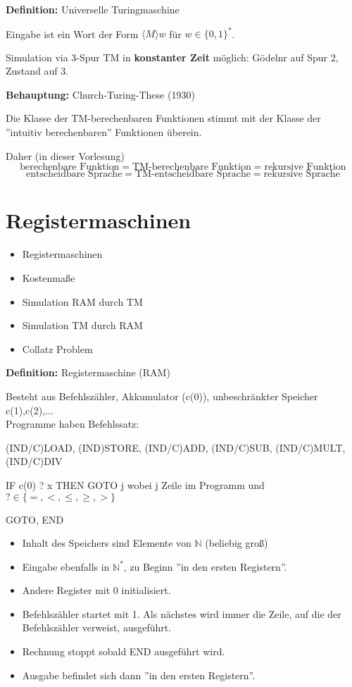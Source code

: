 \documentclass[a4paper,graphics,11pt]{article}
\begin{document}
\strut

\textbf{Definition:} Universelle Turingmaschine

Eingabe ist ein Wort der Form $\langle M\rangle w$ für $w \in \{0,1\}^*$.

Simulation via 3-Spur TM in \textbf{konstanter Zeit} möglich: Gödelnr auf Spur 2, Zustand auf 3.

\strut

\textbf{Behauptung:} Church-Turing-These (1930)

Die Klasse der TM-berechenbaren Funktionen stimmt mit der Klasse der\\
''intuitiv berechenbaren'' Funktionen überein.

Daher (in dieser Vorlesung)
$$
    \text{berechenbare Funktion} = \text{TM-berechenbare Funktion} = \text{rekursive Funktion}
$$$$
    \text{entscheidbare Sprache} = \text{TM-entscheidbare Sprache} = \text{rekursive Sprache}
$$

\newpage

\section{Registermaschinen}

\begin{itemize}
    \item Registermaschinen
    \item Kostenmaße
    \item Simulation RAM durch TM
    \item Simulation TM durch RAM
    \item Collatz Problem
\end{itemize}

\textbf{Definition:} Registermaschine (RAM)

Besteht aus Befehlszähler, Akkumulator (c(0)), unbeschränkter Speicher c(1),c(2),...\\
Programme haben Befehlssatz:

(IND/C)LOAD, (IND)STORE, (IND/C)ADD, (IND/C)SUB, (IND/C)MULT, (IND/C)DIV

IF c(0) ? x THEN GOTO j \qquad wobei j Zeile im Programm und $? \in \{=,<,\leq,\geq,>\}$

GOTO, END


\begin{itemize}
    \item Inhalt des Speichers sind Elemente von $\mathbb{N}$ (beliebig groß)
    \item Eingabe ebenfalls in $\mathbb{N}^*$, zu Beginn ''in den ersten Registern''.
    \item Andere Register mit 0 initialisiert.
    \item Befehlszähler startet mit 1. Als nächstes wird immer die Zeile, auf die der Befehlszähler
        verweist, ausgeführt.
    \item Rechnung stoppt sobald END ausgeführt wird.
    \item Ausgabe befindet sich dann ''in den ersten Registern''.
\end{itemize}
\end{document}
